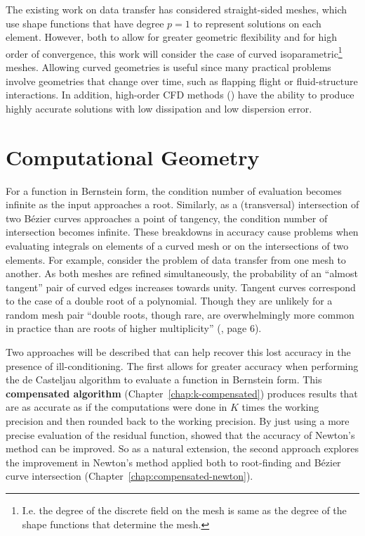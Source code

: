 The existing work on data transfer has considered straight-sided meshes,
which use shape functions that have degree \(p = 1\) to represent solutions
on each element. However, both to allow for greater geometric flexibility
and for high order of convergence, this work will consider the case
of curved isoparametric\footnote{I.e. the degree of the discrete field on the
mesh is same as the degree of the shape functions that determine the
mesh.} meshes. Allowing curved geometries is useful since many practical
problems involve geometries that change over time, such as flapping flight
or fluid-structure interactions. In addition, high-order CFD methods
(\cite{Wang2013}) have the ability to produce highly accurate solutions
with low dissipation and low dispersion error.

\section{Computational Geometry}

For a function in Bernstein form, the condition number of evaluation
becomes infinite as the input approaches a root. Similarly,
as a (transversal) intersection of two B\'{e}zier curves approaches a
point of tangency, the condition number of intersection becomes
infinite. These breakdowns in accuracy cause problems when evaluating
integrals on elements of a curved mesh or on the intersections of two
elements. For example, consider the problem of data transfer from
one mesh to another. As both meshes are refined simultaneously, the
probability of an ``almost tangent'' pair of curved edges increases
towards unity. Tangent curves correspond to the case of a double root
of a polynomial. Though they are unlikely for a random mesh pair
``double roots, though rare, are overwhelmingly more common in practice
than are roots of higher multiplicity'' (\cite{Kahan1972}, page 6).

Two approaches will be described that can help recover this lost accuracy
in the presence of ill-conditioning. The first allows for greater
accuracy when performing the de Casteljau algorithm to evaluate
a function in Bernstein form. This \textbf{compensated algorithm}
(Chapter~\ref{chap:k-compensated}) produces results that are as accurate as if
the computations were done in \(K\) times the working precision
and then rounded back to the working precision. By just using a
more precise evaluation of the residual function,
\cite{Tisseur2001} showed that the accuracy of Newton's method can
be improved. So as a natural extension, the second approach
explores the improvement in Newton's method applied both to
root-finding and B\'{e}zier curve intersection
(Chapter~\ref{chap:compensated-newton}).

